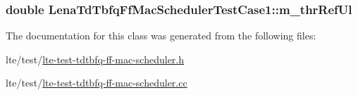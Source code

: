 \subsubsection[{\texorpdfstring{m\+\_\+thr\+Ref\+Ul}{m_thrRefUl}}]{\setlength{\rightskip}{0pt plus 5cm}double Lena\+Td\+Tbfq\+Ff\+Mac\+Scheduler\+Test\+Case1\+::m\+\_\+thr\+Ref\+Ul\hspace{0.3cm}{\ttfamily [private]}}\hypertarget{classLenaTdTbfqFfMacSchedulerTestCase1_a29fb342aaa5b5b5aaa86bd6f804fdbf2}{}\label{classLenaTdTbfqFfMacSchedulerTestCase1_a29fb342aaa5b5b5aaa86bd6f804fdbf2}


The documentation for this class was generated from the following files\+:\begin{DoxyCompactItemize}
\item 
lte/test/\hyperlink{lte-test-tdtbfq-ff-mac-scheduler_8h}{lte-\/test-\/tdtbfq-\/ff-\/mac-\/scheduler.\+h}\item 
lte/test/\hyperlink{lte-test-tdtbfq-ff-mac-scheduler_8cc}{lte-\/test-\/tdtbfq-\/ff-\/mac-\/scheduler.\+cc}\end{DoxyCompactItemize}
